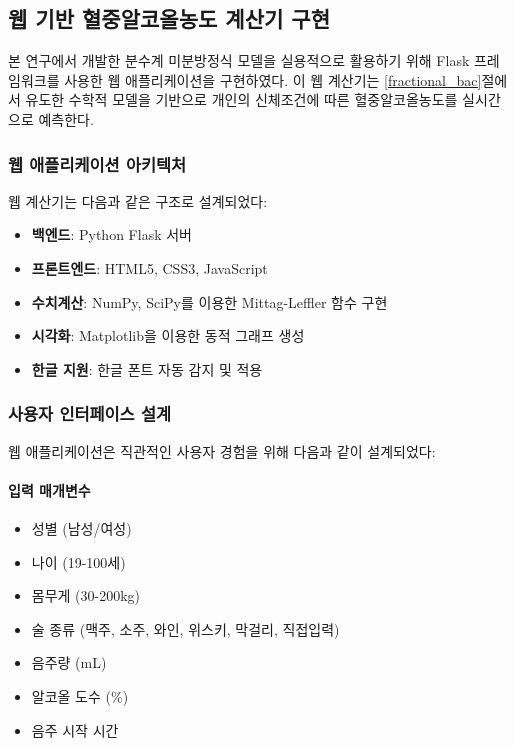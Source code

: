 \documentclass[11pt]{article}
\begin{document}
\subsection{웹 기반 혈중알코올농도 계산기 구현}

본 연구에서 개발한 분수계 미분방정식 모델을 실용적으로 활용하기 위해 Flask 프레임워크를 사용한 웹 애플리케이션을 구현하였다. 이 웹 계산기는 \ref{fractional_bac}절에서 유도한 수학적 모델을 기반으로 개인의 신체조건에 따른 혈중알코올농도를 실시간으로 예측한다.

\subsubsection{웹 애플리케이션 아키텍처}

웹 계산기는 다음과 같은 구조로 설계되었다:

\begin{itemize}
    \item \textbf{백엔드}: Python Flask 서버
    \item \textbf{프론트엔드}: HTML5, CSS3, JavaScript
    \item \textbf{수치계산}: NumPy, SciPy를 이용한 Mittag-Leffler 함수 구현
    \item \textbf{시각화}: Matplotlib을 이용한 동적 그래프 생성
    \item \textbf{한글 지원}: 한글 폰트 자동 감지 및 적용
\end{itemize}

\subsubsection{사용자 인터페이스 설계}

웹 애플리케이션은 직관적인 사용자 경험을 위해 다음과 같이 설계되었다:

\paragraph{입력 매개변수}
\begin{itemize}
    \item 성별 (남성/여성)
    \item 나이 (19-100세)
    \item 몸무게 (30-200kg)
    \item 술 종류 (맥주, 소주, 와인, 위스키, 막걸리, 직접입력)
    \item 음주량 (mL)
    \item 알코올 도수 (\%)
    \item 음주 시작 시간
\end{itemize}
\end{document}
